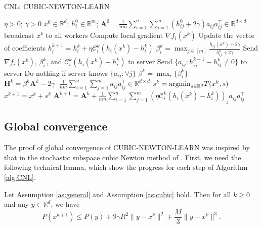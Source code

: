 \documentclass[10pt]{article}
\newcommand{\R}{\mathbb{R}}
\newcommand{\newalpha}{h}
\newcommand{\mA}{\mathbf{A}}
\newcommand{\mH}{\mathbf{H}}
\newcommand{\cC}{{\mathcal{C}}}
\begin{document}
\begin{algorithm}[tb]
	\caption{{\sf CNL: CUBIC-NEWTON-LEARN}}
	\label{alg:CNL}
	\begin{algorithmic}
		 $\eta>0$; $\gamma>0$
		$x^0 \in \R^d$; $h^0_i \in \R^{m}$; $\mA^0 = \frac{1}{nm} \sum \limits_{i=1}^n  \sum\limits_{j=1}^{m} (h_{ij}^0 + 2\gamma)a_{ij}a_{ij}^\top \in \R^{d\times d}$
		\STATE broadcast $x^k$ to all workers 
		\STATE Compute local gradient $\nabla f_i(x^k)$ 
		\STATE Update the vector of coefficients $h^{k+1}_i = h^k_i + \eta \cC_i^k(\newalpha_i(x^k) - h^k_i)$ 
		\STATE $\beta_i^k = \max_{j\in [m]} \frac{\newalpha_{ij}(x^k) + 2\gamma}{h_{ij}^k + 2\gamma}$
		\STATE Send $\nabla f_i(x^k)$, $\beta_i^k$, and $\cC_i^k(\newalpha_i(x^k) - h^k_i)$ to server 
		 Send $\{a_{ij} : h_{ij}^{k+1} - h_{ij}^k \neq 0\}$ to server
		 Do nothing if server knows $\{a_{ij} : \forall j\}$
		\ENDFOR
		\STATE $\beta^k = \max_{i} \{  \beta_i^k  \}$
		\STATE $\mH^k = \beta^k \mA^k - 2\gamma \cdot \frac{1}{nm} \sum\limits_{i=1}^n  \sum\limits_{j=1}^{m}a_{ij}a_{ij}^\top \in \R^{d\times d}$
		\STATE $s^k = {\rm argmin}_{s\in \R^d} T(x^k, s)$
		\STATE $x^{k+1} = x^k + s^k$
		\STATE $\mA^{k+1} = \mA^k + \frac{1}{nm} \sum \limits_{i=1}^n \sum\limits_{j=1}^{m} (\eta \cC_i^k(\newalpha_i(x^k) - h^k_i))_j a_{ij}a_{ij}^\top $
		\ENDFOR
	\end{algorithmic}
\end{algorithm} 






\subsection{Global convergence}

The proof of global convergence of {\sf CUBIC-NEWTON-LEARN} was inspired by that in the stochastic subspace cubic Newton method of \citet{hanzely2020stochastic}. First, we need the following technical lemma, which show the progress for each step of Algorithm \ref{alg:CNL}. 

\begin{lemma}\label{lm:global}
	Let Assumption \ref{as:general} and Assumption \ref{as:cubic} hold. Then for all $k\geq 0$ and any $y \in \R^d$, we have 
	$$
	P(x^{k+1}) \leq P(y) + 9\gamma R^2 \|y-x^k\|^2 + \frac{M}{3}\|y-x^k\|^3. 
	$$
\end{lemma}
\end{document}
